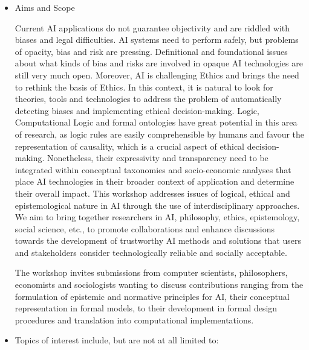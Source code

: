 \documentclass[prodmode,acmtecs]{acmsmall} %
\begin{document}
\begin{itemize}\item  Aims and Scope 
 
  Current AI applications do not guarantee objectivity and are riddled with biases and legal difficulties. AI systems need to perform safely, but problems of opacity, bias and risk are pressing. Definitional and foundational issues about what kinds of bias and risks are involved in opaque AI technologies are still very much open. Moreover, AI is challenging Ethics and brings the need to rethink the basis of Ethics. In this context, it is natural to look for theories, tools and technologies to address the problem of automatically detecting biases and implementing ethical decision-making. Logic, Computational Logic and formal ontologies have great potential in this area of research, as logic rules are easily comprehensible by humans and favour the representation of causality, which is a crucial aspect of ethical decision-making. Nonetheless, their expressivity and transparency need to be integrated within conceptual taxonomies and socio-economic analyses that place AI technologies in their broader context of application and determine their overall impact. This workshop addresses issues of logical, ethical and epistemological nature in AI through the use of interdisciplinary approaches. We aim to bring together researchers in AI, philosophy, ethics, epistemology, social science, etc., to promote collaborations and enhance discussions towards the development of trustworthy AI methods and solutions that users and stakeholders consider technologically reliable and socially acceptable. 
 
   The workshop invites submissions from computer scientists, philosophers, economists and sociologists wanting to discuss contributions ranging from the formulation of epistemic and normative principles for AI, their conceptual representation in formal models, to their development in formal design procedures and translation into computational implementations. 
 
\item  Topics of interest include, but are not at all limited to: 
 

\end{itemize}
\end{document}
